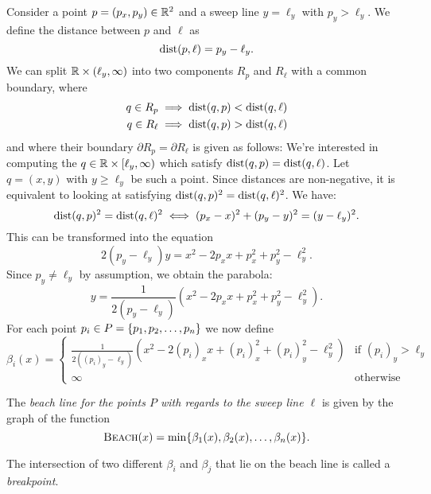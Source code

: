 \newpage
Consider a point $p = (p_x, p_y) \in \mathbb{R}^2$ and a sweep line $y = \ell_y$ with $p_y > \ell_y$. We define the distance between $p$ and $\ell$ as
\[
    \operatorname{dist}(p, \ell) = p_y - \ell_y.
\]
We can split $\mathbb{R} \times (\ell_y, \infty)$ into two components $R_p$ and $R_{\ell}$ with a common boundary, where
\begin{align*}
    q \in R_p &\implies \operatorname{dist}(q, p) < \operatorname{dist}(q, \ell) \\ 
    q \in R_\ell &\implies \operatorname{dist}(q, p) > \operatorname{dist}(q, \ell)
\end{align*}
and where their boundary $\partial R_p = \partial R_\ell$ is given as follows: We're interested in computing the $q \in \mathbb{R} \times [\ell_y, \infty)$ which satisfy $\operatorname{dist}(q, p) = \operatorname{dist}(q, \ell)$. Let $q = (x, y)$ with $y \geq \ell_y$ be such a point. Since distances are non-negative, it is equivalent to looking at satisfying $\operatorname{dist}(q, p)^2 = \operatorname{dist}(q, \ell)^2$. We have:
\[
    \operatorname{dist}(q, p)^2 = \operatorname{dist}(q, \ell)^2 \iff (p_x - x)^2 + (p_y - y)^2 = (y - \ell_y)^2.
\]
This can be transformed into the equation
\begin{equation}
    2 (p_y - \ell_y) y = x^2 - 2 p_x x + p_x^2 + p_y^2 - \ell_y^2.
\end{equation}
Since $p_y \ne \ell_y$ by assumption, we obtain the parabola:
\begin{equation} \label{eq:parabola}
    y = \frac{1}{2 (p_y - \ell_y)} (x^2 - 2 p_x x + p_x^2 + p_y^2 - \ell_y^2).
\end{equation}
For each point $p_i \in P = \{p_1, p_2, \ldots, p_n\}$ we now define
\[
    \beta_i(x) = \begin{cases}
        \displaystyle \frac{1}{2 ((p_i)_y - \ell_y)} (x^2 - 2 (p_i)_x x + (p_i)_x^2 + (p_i)_y^2 - \ell_y^2) & \text{if } (p_i)_y > \ell_y \\
        \infty & \text{otherwise}
    \end{cases}
\]
\begin{defn}
The \emph{beach line for the points $P$ with regards to the sweep line $\ell$} is given by the graph of the function
\[
    \textsc{Beach}(x) = \min\{\beta_1(x), \beta_2(x), \ldots, \beta_n(x)\}.
\]
\end{defn}

\begin{defn}[Breakpoint]
The intersection of two different $\beta_i$ and $\beta_j$ that lie on the beach line is called a \emph{breakpoint}.
\end{defn}


